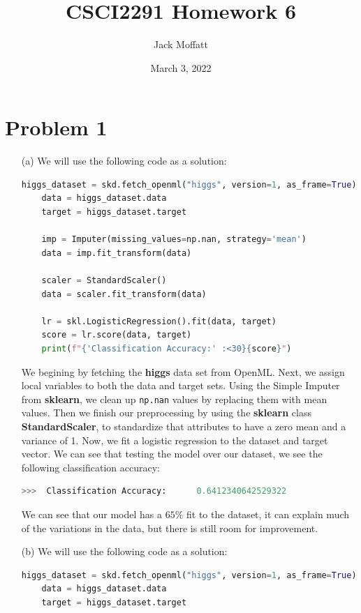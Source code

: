 \documentclass[12pt, letterpaper]{article}
\title{CSCI2291 Homework 6}
\author{Jack Moffatt}
\date{March 3, 2022}
\begin{document}
\maketitle
\noindent\makebox[\linewidth]{\rule{18cm}{0.4pt}}
\section*{Problem 1}

\begin{enumerate}
    \item [(a)] We will use the following code as a solution:
\begin{lstlisting}[language = python]
    higgs_dataset = skd.fetch_openml("higgs", version=1, as_frame=True)
    data = higgs_dataset.data
    target = higgs_dataset.target

    imp = Imputer(missing_values=np.nan, strategy='mean')
    data = imp.fit_transform(data)

    scaler = StandardScaler()
    data = scaler.fit_transform(data)

    lr = skl.LogisticRegression().fit(data, target)
    score = lr.score(data, target)
    print(f"{'Classification Accuracy:' :<30}{score}")
\end{lstlisting}
    We begining by fetching the {\bf higgs} data set from OpenML. Next, we assign local variables 
    to both the data and target sets. Using the Simple Imputer from {\bf sklearn}, we clean up 
    \texttt{np.nan} values by replacing them with mean values. Then we finish our preprocessing by 
    using the {\bf sklearn} class {\bf StandardScaler}, to standardize that attributes to have a zero mean 
    and a variance of 1.
    Now, we fit a logistic regression to the dataset and target vector. We can see that testing the 
    model over our dataset, we see the following classification accuracy:
\begin{lstlisting}[language = python]
    >>>  Classification Accuracy:      0.6412340642529322
\end{lstlisting}
    We can see that our model has a $65\%$ fit to the dataset, it
    can explain much of the variations in the data, but there is still room for improvement. 
\newpage
    \item [(b)] We will use the following code as a solution:
\begin{lstlisting}[language = python]
    higgs_dataset = skd.fetch_openml("higgs", version=1, as_frame=True)
    data = higgs_dataset.data
    target = higgs_dataset.target
    

\end{lstlisting}
\end{enumerate}
\end{document}
